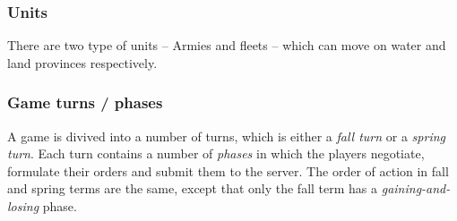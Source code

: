 \documentclass[pdftex,12pt,a4paper]{report}
\begin{document}
\subsubsection{Units}

There are two type of units -- Armies and fleets -- which can move on 
water and land provinces respectively.

\subsubsection{Game turns / phases}

A game is divived into a number of turns, which is either a
\textit{fall turn} or a \textit{spring turn}. Each turn contains a
number of \textit{phases} in which the players negotiate, formulate
their orders and submit them to the server. The order of action in
fall and spring terms are the same, except that only the fall term
has a \textit{gaining-and-losing} phase.
\end{document}
